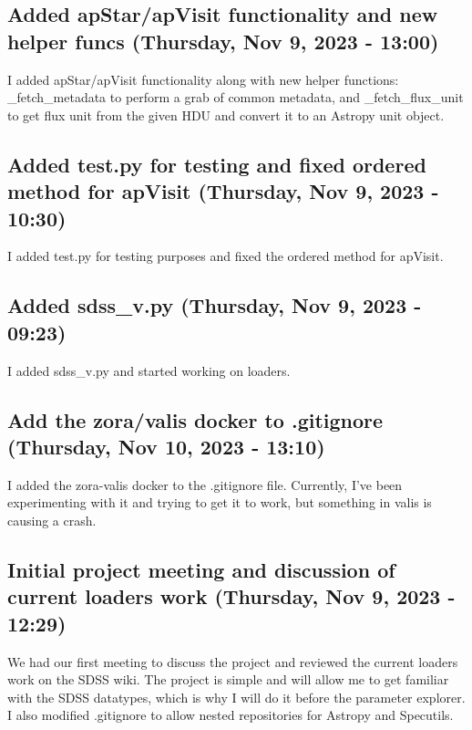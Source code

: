 \documentclass[a4paper]{article}
\begin{document}
\subsection*{Added apStar/apVisit functionality and new helper funcs (Thursday, Nov 9, 2023 - 13:00)}
I added apStar/apVisit functionality along with new helper functions: \_fetch\_metadata to perform a grab of common metadata, and \_fetch\_flux\_unit to get flux unit from the given HDU and convert it to an Astropy unit object.

\subsection*{Added test.py for testing and fixed ordered method for apVisit (Thursday, Nov 9, 2023 - 10:30)}
I added test.py for testing purposes and fixed the ordered method for apVisit.

\subsection*{Added sdss\_v.py (Thursday, Nov 9, 2023 - 09:23)}
I added sdss\_v.py and started working on loaders.

\subsection*{Add the zora/valis docker to .gitignore (Thursday, Nov 10, 2023 - 13:10)}
I added the zora-valis docker to the .gitignore file. Currently, I've been experimenting with it and trying to get it to work, but something in valis is causing a crash.

\subsection*{Initial project meeting and discussion of  current loaders work (Thursday, Nov 9, 2023 - 12:29)}
We had our first meeting to discuss the project and reviewed the current loaders work on the SDSS wiki. The project is simple and will allow me to get familiar with the SDSS datatypes, which is why I will do it before the parameter explorer.
I also modified .gitignore to allow nested repositories for Astropy and Specutils.
\end{document}
